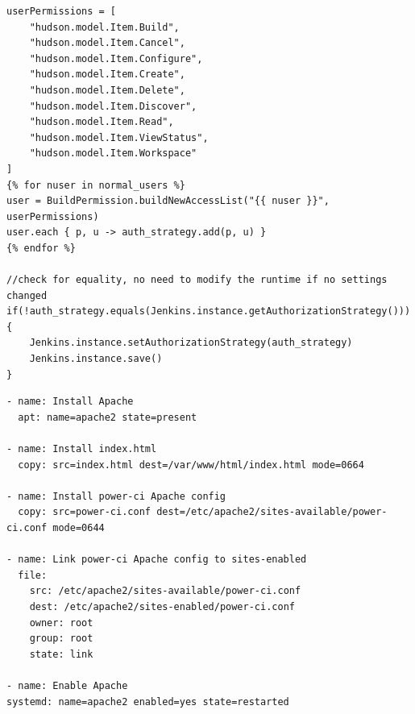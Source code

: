 \documentclass[10pt,letterpaper,onecolumn,draftclsnofoot]{IEEEtran}
\begin{document}
\begin{lstlisting}[caption=Template for configuring authentication]
userPermissions = [
	"hudson.model.Item.Build",
	"hudson.model.Item.Cancel",
	"hudson.model.Item.Configure",
	"hudson.model.Item.Create",
	"hudson.model.Item.Delete",
	"hudson.model.Item.Discover",
	"hudson.model.Item.Read",
	"hudson.model.Item.ViewStatus",
	"hudson.model.Item.Workspace"
]
{% for nuser in normal_users %}
user = BuildPermission.buildNewAccessList("{{ nuser }}", userPermissions)
user.each { p, u -> auth_strategy.add(p, u) }
{% endfor %}

//check for equality, no need to modify the runtime if no settings changed
if(!auth_strategy.equals(Jenkins.instance.getAuthorizationStrategy())) {
    Jenkins.instance.setAuthorizationStrategy(auth_strategy)
    Jenkins.instance.save()
}
\end{lstlisting}

\begin{lstlisting}[caption=Web Task]
- name: Install Apache
  apt: name=apache2 state=present

- name: Install index.html
  copy: src=index.html dest=/var/www/html/index.html mode=0664

- name: Install power-ci Apache config
  copy: src=power-ci.conf dest=/etc/apache2/sites-available/power-ci.conf mode=0644

- name: Link power-ci Apache config to sites-enabled
  file: 
    src: /etc/apache2/sites-available/power-ci.conf
    dest: /etc/apache2/sites-enabled/power-ci.conf
    owner: root
    group: root
    state: link

- name: Enable Apache
systemd: name=apache2 enabled=yes state=restarted
\end{lstlisting}
\clearpage
\end{document}
